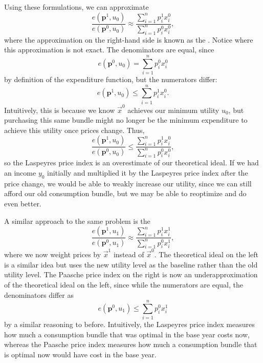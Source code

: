 Using these formulations, we can approximate 
$$\frac{e\left(\mathbf{p}^{1}, u_{0}\right)}{e\left(\mathbf{p}^{0}, u_{0}\right)} \approx \frac{\sum_{i=1}^{n} p_{i}^{1} x_{i}^{0}}{\sum_{i=1}^{n} p_{i}^{0} x_{i}^{0}},$$
where the approximation on the right-hand side is known as the . Notice where this approximation is not exact. The denominators are equal, since 
$$e\left(\mathbf{p}^{0}, u_{0}\right) = \sum_{i=1}^{n} p_{i}^{0} x_{i}^{0}$$
by definition of the expenditure function, but the numerators differ:
$$e\left(\mathbf{p}^{1}, u_{0}\right) \leq \sum_{i=1}^{n} p_{i}^{1} x_{i}^{0}.$$
Intuitively, this is because we know $\vec{x}^0$ achieves our minimum utility $u_0$, but purchasing this same bundle might no longer be the minimum expenditure to achieve this utility once prices change. Thus, 
$$\frac{e\left(\mathbf{p}^{1}, u_{0}\right)}{e\left(\mathbf{p}^{0}, u_{0}\right)} \leq \frac{\sum_{i=1}^{n} p_{i}^{1} x_{i}^{0}}{\sum_{i=1}^{n} p_{i}^{0} x_{i}^{0}},$$
so the Laspeyres price index is an overestimate of our theoretical ideal. If we had an income $y_0$ initially and multiplied it by the Laspeyres price index after the price change, we would be able to weakly increase our utility, since we can still afford our old consumption bundle, but we may be able to reoptimize and do even better.

A similar approach to the same problem is the 
$$\frac{e\left(\mathbf{p}^{1}, u_{1}\right)}{e\left(\mathbf{p}^{0}, u_{1}\right)} \approx \frac{\sum_{i=1}^{n} p_{i}^{1} x_{i}^{1}}{\sum_{i=1}^{n} p_{i}^{0} x_{i}^{1}},$$
where we now weight prices by $\vec{x}^1$ instead of $\vec{x}^0$. The theoretical ideal on the left is a similar idea but uses the new utility level as the baseline rather than the old utility level. The Paasche price index on the right is now an underapproximation of the theoretical ideal on the left, since while the numerators are equal, the denominators differ as
$$e\left(\mathbf{p}^{0}, u_{1}\right) \leq \sum_{i=1}^{n} p_{i}^{0} x_{i}^{1}$$
by a similar reasoning to before. Intuitively, the Laspeyres price index measures how much a consumption bundle that was optimal in the base year costs now, whereas the Paasche price index measures how much a consumption bundle that is optimal now would have cost in the base year. 

